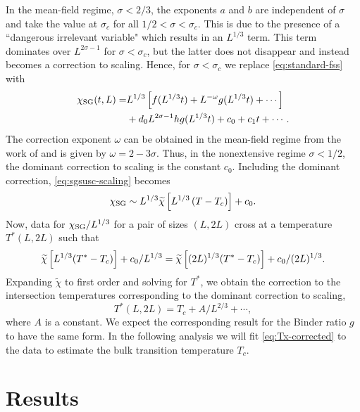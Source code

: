 In the mean-field regime, $\sigma<2/3$, the exponents $a$ and $b$ are
independent of $\sigma$
\autocite{binder1985finite,luijten1999finite,jones2005finite} and take the
value at $\sigma_c$ for all $1/2<\sigma<\sigma_c$. This is due to the presence
of a ``dangerous irrelevant variable" which results in an $L^{1/3}$ term. This
term dominates over $L^{2\sigma-1}$ for $\sigma<\sigma_c$, but the latter does
not disappear and instead becomes a correction to scaling. Hence, for
$\sigma<\sigma_c$ we replace \cref{eq:standard-fss} with
\begin{align*}
  \chi_{\mathrm{SG}}(t,L)
  = &L^{1/3}\left[f(L^{1/3}t) + L^{-\omega} g(L^{1/3}t) + \cdots\right]\\
    &+ d_0 L^{2\sigma-1} h g(L^{1/3}t) + c_0 + c_1 t + \cdots.
\end{align*}
The correction exponent $\omega$ can be obtained in the mean-field regime from
the work of \textcite{kotliar1983one} and is given by $\omega=2-3\sigma$. Thus,
in the nonextensive regime $\sigma<1/2$, the dominant correction to scaling is
the constant $c_0$. Including the dominant correction, \cref{eq:sgsusc-scaling}
becomes
\begin{equation}
  \chi_{\mathrm{SG}} \sim L^{1/3} \widetilde{\chi}\left[L^{1/3}\left(T-T_c\right)\right] + c_0.
  \label{eq:sgsusc-scaling-corrected}
\end{equation}
Now, data for $\chi_{\mathrm{SG}}/L^{1/3}$ for a pair of sizes $(L,2L)$ cross
at a temperature $T^*(L,2L)$ such that
\begin{equation}
  \widetilde{\chi}\left[L^{1/3}(T^*-T_c)\right] + c_0/L^{1/3}
  =\widetilde{\chi}\left[(2L)^{1/3}(T^*-T_c)\right] + c_0/(2L)^{1/3}.
\end{equation}
Expanding $\widetilde{\chi}$ to first order and solving for $T^*$, we obtain
the correction to the intersection temperatures corresponding to the dominant
correction to scaling,
\begin{equation}
  T^*(L,2L) = T_c + A/L^{2/3} + \cdots,
  \label{eq:Tx-corrected}
\end{equation}
where $A$ is a constant. We expect the corresponding result for the Binder
ratio $g$ to have the same form.
In the following analysis we will fit \cref{eq:Tx-corrected} to the data to
estimate the bulk transition temperature $T_c$.


\section{Results}

